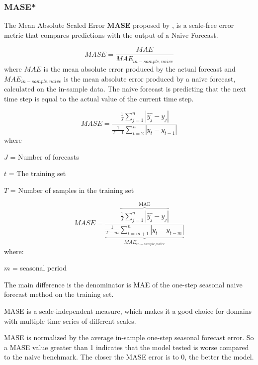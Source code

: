 \subsubsection{MASE*}
The Mean Absolute Scaled Error \textbf{MASE}
proposed by \cite{Hyndman2006}, is a scale-free
error metric that compares predictions with
the output of a Naive Forecast.


\begin{displaymath}
  MASE = \frac{MAE}{MAE_{in-sample, naive}}
\end{displaymath}
where $MAE$ is the mean absolute error
produced by the actual forecast and
$MAE_{in-sample, naive} $
is the mean absolute error produced by
a naive forecast, calculated on the in-sample data.
The naive forecast is predicting that the next
time step is equal to the actual value of the current time step.


\begin{displaymath}
  \label{eq:MASE}
  MASE = \frac{\frac{1}{J} \sum_{j=1}^n |\hat{y_j} - y_j|}{\frac{1}{T-1} \sum_{t=2}^n |y_t - y_{t-1}|}
\end{displaymath}
where

$J$ = Number of forecasts

$t$ = The training set

$T$ = Number of samples in the training set

\begin{equation}
  \label{eq:MASE-Seasonal}
  MASE = \frac{
    \overbrace{
      \frac{1}{J} \sum_{j=1}^n |\hat{y_j} - y_j|}^\text{MAE}}{
    \underbrace{
      \frac{1}{T-m} \sum_{t=m+1}^n |y_t - y_{t-m}|}_\text{$MAE_{in-sample, naive}$}
  }
\end{equation}
where:

$m$ = seasonal period

The main difference is the denominator is MAE
of the one-step seasonal naive forecast method on the training set.

MASE is a scale-independent measure, which makes it
a good choice for domains with multiple time series of
different scales.

MASE is normalized by the average in-sample one-step
seasonal forecast error. So a MASE value greater than
1 indicates that the model tested is worse compared
to the naive benchmark.
The closer the MASE error is to 0, the better the model.


